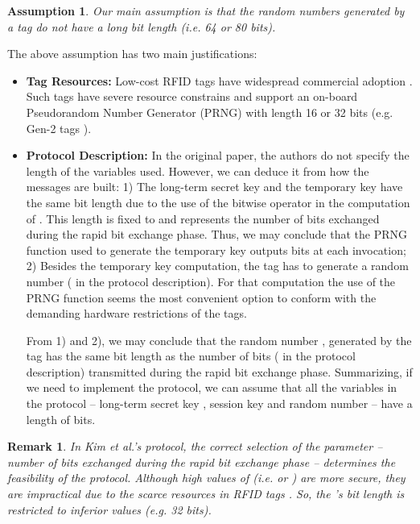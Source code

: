 \documentclass{article}
\newtheorem{assumption}{Assumption}
\newtheorem{remark}{Remark}
\begin{document}
\begin{assumption}
Our main assumption is that the random numbers generated by a tag do not have a long bit length (i.e. 64 or 80 bits). \\
\end{assumption}

The above assumption has two main justifications:

\begin{itemize}
  \item \textbf{Tag Resources:} Low-cost RFID tags have widespread commercial adoption \cite{Bevan2007}. Such tags have severe resource constrains and support an on-board Pseudorandom Number Generator (PRNG) with length 16 or 32 bits (e.g. Gen-2 tags \cite{EPCC1G2-2008}).
  \item \textbf{Protocol Description:} In the original paper, the authors do not specify the length of the variables used. However, we can deduce it from how the messages are built: 1) The long-term secret key  and the temporary key  have the same bit length due to the use of the bitwise operator in the computation of . This length is fixed to  and represents the number of bits exchanged during the rapid bit exchange phase. Thus, we may conclude that the PRNG function used to generate the temporary key outputs  bits at each invocation; 2) Besides the temporary key computation, the tag has to generate a random number ( in the protocol description). For that computation the use of the PRNG function seems the most convenient option to conform with the demanding hardware restrictions of the tags.

      From 1) and 2), we may conclude that the random number , generated by the tag has the same bit length as the number of bits ( in the protocol description) transmitted during the rapid bit exchange phase.  Summarizing,  if we need to implement the protocol, we can assume that all the variables in the protocol -- long-term secret key , session key  and random number  -- have a length of  bits.

\end{itemize}

\begin{remark}
In Kim et al.'s \cite{KimAKSP-2008-icisc} protocol, the correct selection of the parameter  -- number of bits exchanged during the rapid bit exchange phase -- determines the feasibility of the protocol. Although high values of  (i.e.  or ) are more secure, they are impractical due to the scarce resources in RFID tags \cite{AvoineT-2009-isc}. So, the 's bit length is restricted to inferior values (e.g. 32 bits).
\end{remark}
\end{document}

